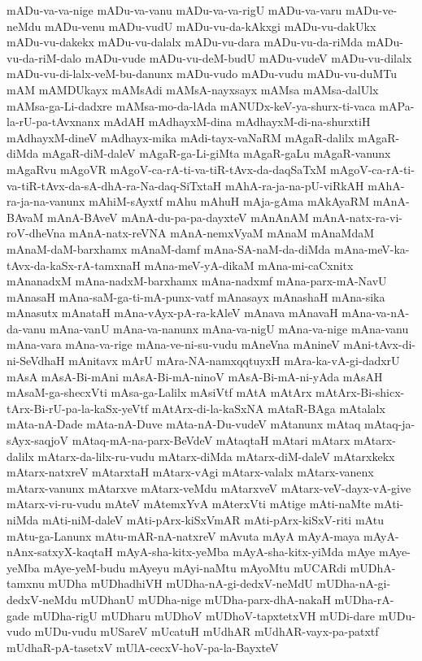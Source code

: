 {mADu-va-va-nige
mADu-va-vanu
mADu-va-va-rigU
mADu-va-varu
mADu-ve-neMdu
mADu-venu
mADu-vudU
mADu-vu-da-kAkxgi
mADu-vu-dakUkx
mADu-vu-dakekx
mADu-vu-dalalx
mADu-vu-dara
mADu-vu-da-riMda
mADu-vu-da-riM-dalo
mADu-vude
mADu-vu-deM-budU
mADu-vudeV
mADu-vu-dilalx
mADu-vu-di-lalx-veM-bu-danunx
mADu-vudo
mADu-vudu
mADu-vu-duMTu
mAM
mAMDUkayx
mAMsAdi
mAMsA-nayxsayx
mAMsa
mAMsa-dalUlx
mAMsa-ga-Li-dadxre
mAMsa-mo-da-lAda
mANUDx-keV-ya-shurx-ti-vaca
mAPa-la-rU-pa-tAvxnanx
mAdAH
mAdhayxM-dina
mAdhayxM-di-na-shurxtiH
mAdhayxM-dineV
mAdhayx-mika
mAdi-tayx-vaNaRM
mAgaR-dalilx
mAgaR-diMda
mAgaR-diM-daleV
mAgaR-ga-Li-giMta
mAgaR-gaLu
mAgaR-vanunx
mAgaRvu
mAgoVR
mAgoV-ca-rA-ti-va-tiR-tAvx-da-daqSaTxM
mAgoV-ca-rA-ti-va-tiR-tAvx-da-sA-dhA-ra-Na-daq-SiTxtaH
mAhA-ra-ja-na-pU-viRkAH
mAhA-ra-ja-na-vanunx
mAhiM-sAyxtf
mAhu
mAhuH
mAja-gAma
mAkAyaRM
mAnA-BAvaM
mAnA-BAveV
mAnA-du-pa-pa-dayxteV
mAnAnAM
mAnA-natx-ra-vi-roV-dheVna
mAnA-natx-reVNA
mAnA-nemxVyaM
mAnaM
mAnaMdaM
mAnaM-daM-barxhamx
mAnaM-damf
mAna-SA-naM-da-diMda
mAna-meV-ka-tAvx-da-kaSx-rA-tamxnaH
mAna-meV-yA-dikaM
mAna-mi-caCxnitx
mAnanadxM
mAna-nadxM-barxhamx
mAna-nadxmf
mAna-parx-mA-NavU
mAnasaH
mAna-saM-ga-ti-mA-punx-vatf
mAnasayx
mAnashaH
mAna-sika
mAnasutx
mAnataH
mAna-vAyx-pA-ra-kAleV
mAnava
mAnavaH
mAna-va-nA-da-vanu
mAna-vanU
mAna-va-nanunx
mAna-va-nigU
mAna-va-nige
mAna-vanu
mAna-vara
mAna-va-rige
mAna-ve-ni-su-vudu
mAneVna
mAnineV
mAni-tAvx-di-ni-SeVdhaH
mAnitavx
mArU
mAra-NA-namxqqtuyxH
mAra-ka-vA-gi-dadxrU
mAsA
mAsA-Bi-mAni
mAsA-Bi-mA-ninoV
mAsA-Bi-mA-ni-yAda
mAsAH
mAsaM-ga-shecxVti
mAsa-ga-Lalilx
mAsiVtf
mAtA
mAtArx
mAtArx-Bi-shicx-tArx-Bi-rU-pa-la-kaSx-yeVtf
mAtArx-di-la-kaSxNA
mAtaR-BAga
mAtalalx
mAta-nA-Dade
mAta-nA-Duve
mAta-nA-Du-vudeV
mAtanunx
mAtaq
mAtaq-ja-sAyx-saqjoV
mAtaq-mA-na-parx-BeVdeV
mAtaqtaH
mAtari
mAtarx
mAtarx-dalilx
mAtarx-da-lilx-ru-vudu
mAtarx-diMda
mAtarx-diM-daleV
mAtarxkekx
mAtarx-natxreV
mAtarxtaH
mAtarx-vAgi
mAtarx-valalx
mAtarx-vanenx
mAtarx-vanunx
mAtarxve
mAtarx-veMdu
mAtarxveV
mAtarx-veV-dayx-vA-give
mAtarx-vi-ru-vudu
mAteV
mAtemxYvA
mAterxVti
mAtige
mAti-naMte
mAti-niMda
mAti-niM-daleV
mAti-pArx-kiSxVmAR
mAti-pArx-kiSxV-riti
mAtu
mAtu-ga-Lanunx
mAtu-mAR-nA-natxreV
mAvuta
mAyA
mAyA-maya
mAyA-nAnx-satxyX-kaqtaH
mAyA-sha-kitx-yeMba
mAyA-sha-kitx-yiMda
mAye
mAye-yeMba
mAye-yeM-budu
mAyeyu
mAyi-naMtu
mAyoMtu
mUCARdi
mUDhA-tamxnu
mUDha
mUDhadhiVH
mUDha-nA-gi-dedxV-neMdU
mUDha-nA-gi-dedxV-neMdu
mUDhanU
mUDha-nige
mUDha-parx-dhA-nakaH
mUDha-rA-gade
mUDha-rigU
mUDharu
mUDhoV
mUDhoV-tapxtetxVH
mUDi-dare
mUDu-vudo
mUDu-vudu
mUSareV
mUcatuH
mUdhAR
mUdhAR-vayx-pa-patxtf
mUdhaR-pA-tasetxV
mUlA-cecxV-hoV-pa-la-BayxteV
}
